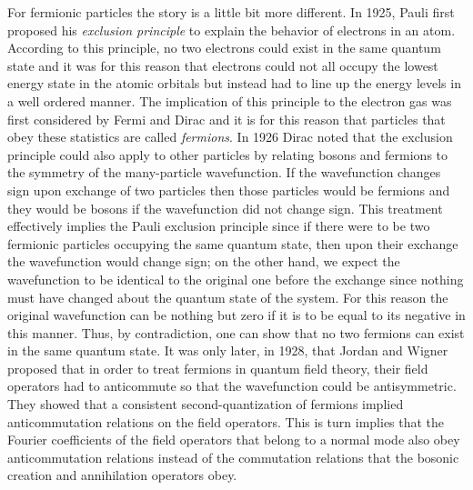 For fermionic particles the story is a little bit more different.
In 1925, Pauli first proposed his {\it exclusion principle} \cite{pauli} to explain the behavior
of electrons in an atom. According to this principle, no two electrons could
exist in the same quantum state and it was for this reason that electrons could not
all occupy the lowest energy state in the atomic orbitals but instead had to line up
the energy levels in a well ordered manner. The implication of this principle to the
electron gas was first considered by Fermi and Dirac and it is for this reason that
particles that obey these statistics are called {\it fermions}. In 1926 Dirac noted
\cite{dirac} that the exclusion principle could also apply to other particles
by relating bosons and fermions to the symmetry of the many-particle
wavefunction. If the wavefunction changes sign upon exchange of two
particles then those particles would be fermions and they would be bosons
if the wavefunction did not change sign. This treatment effectively
implies the Pauli exclusion principle since if there were to be two fermionic
particles occupying the same quantum state, then upon their exchange
the wavefunction would change sign; on the other hand, we expect the wavefunction
to be identical to the original one before the exchange since nothing must have
changed about the quantum state of the system. For this reason the original
wavefunction can be nothing but zero if it is to be equal to its negative in
this manner. Thus, by contradiction, one can show that no two fermions can exist
in the same quantum state. It was only later, in 1928, that Jordan and Wigner
proposed \cite{jordan-wigner} that in order to treat fermions in
quantum field theory, their field operators had to anticommute so
that the wavefunction could be antisymmetric. They showed that a
consistent second-quantization of fermions implied anticommutation
relations on the field operators. This is turn implies that the Fourier coefficients
of the field operators that belong to a normal mode also obey anticommutation
relations instead of the commutation relations that the bosonic creation and
annihilation operators obey.


